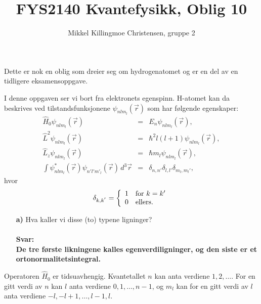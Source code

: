 \documentclass[11pt,a4paper]{report}
\title{FYS2140 Kvantefysikk, Oblig 10}
\author{Mikkel Killingmoe Christensen, gruppe 2}
\newcounter{excount}[chapter]
\newenvironment{exercise}[1][]{\addtocounter{excount}{1} \noindent {\bf Oppgave
    \arabic{excount} \ \ #1}\hspace{2mm}}{\vspace{4mm}}
\begin{document}
\maketitle



\noindent
Dette er nok en oblig som dreier seg om hydrogenatomet og er en del av en tidligere eksamensoppgave.

\bigskip

\begin{exercise}[\\]
I denne oppgaven ser vi bort fra elektronets egenspinn. H-atomet kan da beskrives ved tilstandsfunksjonene $\psi_{n l m_{l}}(\vec{r})$ som har f{\o}lgende egenskaper:
\begin{eqnarray}
\hat{H}_0 \psi_{n l m_{l}}(\vec{r}) &=&
E_{n} \psi_{n l m_{l}}(\vec{r}),                   \\
\hat{L}^2 \psi_{n l m_{l}}(\vec{r}) &=&
\hbar^2 l(l+1) \psi_{n l m_{l}}(\vec{r}),          \\
\hat{L}_{z} \psi_{n l m_{l}}(\vec{r}) &=&
\hbar m_l \psi_{n l m_{l}}(\vec{r}),                \\
\int \psi^{*}_{n l m_{l}}(\vec{r}) \psi_{n' l' m'_{l}}(\vec{r}) \, d^3\vec{r} &=&
\delta_{n,n'} \delta_{l,l'} \delta_{m_l,m_l'},
\end{eqnarray}
hvor
\begin{equation}
\delta_{k,k^{'}} = \left \{ \begin{array}{ll} 1& {\rm for~} k = k'\\
															  0 & {\rm ellers.}\\
										 \end{array}
							\right . \nonumber
\end{equation}
\begin{itemize}
\item[\bf a)] Hva kaller vi disse (to) typene ligninger?\\
\\
\textbf{Svar:}\\
\textbf{De tre første likningene kalles egenverdiligninger, og den siste er et ortonormalitetsintegral. }
\end{itemize}

\noindent
Operatoren $\hat{H}_{0}$ er tidsuavhengig. Kvantetallet $n$ kan anta verdiene $1, 2,\ldots$. For en gitt verdi av $n$ kan $l$ anta verdiene $0, 1, \ldots , n-1$, og $m_{l}$ kan for en gitt verdi av $l$ anta verdiene $-l, -l+1, \ldots , l-1, l$.


\end{exercise}
\end{document}
